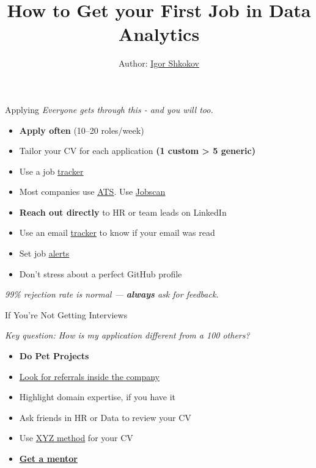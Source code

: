 \documentclass[10pt,a4paper]{article}
\date{} %
\title{How to Get your First Job in \textbf{Data Analytics}}
\author{Author: \href{https://www.linkedin.com/in/igorshkokov/}{Igor Shkokov}}
\begin{document}
\small
\begin{multicols}{3}

\maketitle
\thispagestyle{empty}
\scriptsize

\begin{textbox}{Applying}
\emph{Everyone gets through this - and you will too.}
\begin{itemize}
  \item \textbf{Apply often} (10--20 roles/week)
  \item Tailor your CV for each application \textbf{(1 custom > 5 generic)}
  \item Use a job \href{https://huntr.co/product/job-tracker}{tracker}
  \item Most companies use \href{https://en.wikipedia.org/wiki/Applicant_tracking_system}{ATS}. Use \href{https://www.jobscan.co/}{Jobscan}
  \item \textbf{Reach out directly} to HR or team leads on LinkedIn
  \item Use an email \href{https://chromewebstore.google.com/detail/email-tracker/bnompdfnhdbgdaoanapncknhmckenfog}{tracker} to know if your email was read
  \item Set job \href{https://www.linkedin.com/jobs/jam/}{alerts}
  \item Don't stress about a perfect GitHub profile

\end{itemize}

\emph{99\% rejection rate is normal --- \textbf{always} ask for feedback.} 
\end{textbox}

\begin{textboxGray}{If You're Not Getting Interviews}

\emph{Key question: How is my application different from a 100 others?}

\begin{itemize}
    \item \textbf{Do Pet Projects}
    \item \href{https://www.linkedin.com/pulse/art-asking-referral-linkedin-comprehensive-guide-simon-siew-nz8ff/}{Look for referrals inside the company} 
    \item Highlight domain expertise, if you have it
    \item Ask friends in HR or Data to review your CV
    \item Use \href{https://www.tealhq.com/post/xyz-resume}{XYZ method} for your CV
    \item \href{https://adplist.org/}{\textbf{Get a mentor}}  


\end{itemize}
\end{textboxGray}
\end{multicols}
\end{document}
